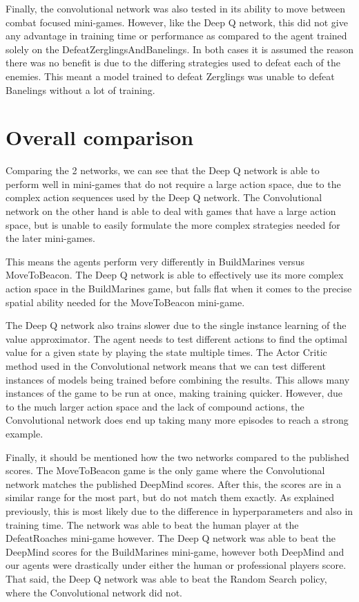Finally, the convolutional network was also tested in its ability to move
between combat focused mini-games. However, like the Deep Q network, this did
not give any advantage in training time or performance as compared to the agent
trained solely on the DefeatZerglingsAndBanelings. In both cases it is assumed
the reason there was no benefit is due to the differing strategies used to
defeat each of the enemies. This meant a model trained to defeat Zerglings was
unable to defeat Banelings without a lot of training.

\section{Overall comparison}

Comparing the 2 networks, we can see that the Deep Q network is able to perform
well in mini-games that do not require a large action space, due to the complex
action sequences used by the Deep Q network. The Convolutional network on the
other hand is able to deal with games that have a large action space, but is
unable to easily formulate the more complex strategies needed for the later
mini-games.

This means the agents perform very differently in BuildMarines versus MoveToBeacon.
The Deep Q network is able to effectively use its more complex action space in
the BuildMarines game, but falls flat when it comes to the precise spatial
ability needed for the MoveToBeacon mini-game.

The Deep Q network also trains slower due to the single instance learning of the
value approximator. The agent needs to test different actions to find the
optimal value for a given state by playing the state multiple times. The Actor
Critic method used in the Convolutional network means that we can test different
instances of models being trained before combining the results. This allows many
instances of the game to be run at once, making training quicker. However, due
to the much larger action space and the lack of compound actions, the
Convolutional network does end up taking many more episodes to reach a strong
example.

Finally, it should be mentioned how the two networks compared to the published
scores. The MoveToBeacon game is the only game where the Convolutional network
matches the published DeepMind scores. After this, the scores are in a similar
range for the most part, but do not match them exactly. As explained previously,
this is most likely due to the difference in hyperparameters and also in
training time. The network was able to beat the human player at the
DefeatRoaches mini-game however. The Deep Q network was able to beat the
DeepMind scores for the BuildMarines mini-game, however both DeepMind and our
agents were drastically under either the human or professional players score.
That said, the Deep Q network was able to beat the Random Search policy, where
the Convolutional network did not.

